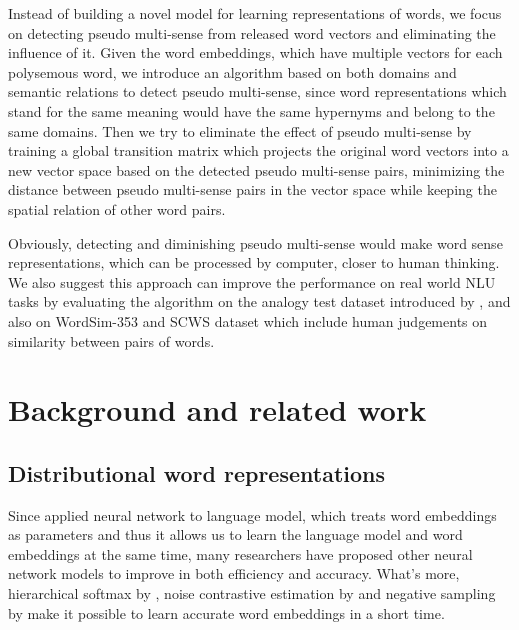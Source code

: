 \documentclass[11pt]{article}
\begin{document}
\par
Instead of building a novel model for learning representations of words, we focus on detecting pseudo multi-sense from released word vectors and eliminating the influence of it. Given the word embeddings, which have multiple vectors for each polysemous word, we introduce an algorithm based on both domains and semantic relations to detect pseudo multi-sense, since word representations which stand for the same meaning would have the same hypernyms and belong to the same domains. Then we try to eliminate the effect of pseudo multi-sense by training a global transition matrix which projects the original word vectors into a new vector space based on the detected pseudo multi-sense pairs, minimizing the distance between pseudo multi-sense pairs in the vector space while keeping the spatial relation of other word pairs. 
\par
Obviously, detecting and diminishing pseudo multi-sense would make word sense representations, which can be processed by computer, closer to human thinking. We also suggest this approach can improve the performance on real world NLU tasks by evaluating the algorithm on the analogy test dataset introduced by , and also on WordSim-353 \cite{finkelstein2001placing} and SCWS \cite{huang2012improving} dataset which include human judgements on similarity between pairs of words.


\section{Background and related work}
\subsection{Distributional word representations}
Since  applied neural network to language model, which treats word embeddings as parameters and thus it allows us to learn the language model and word embeddings at the same time, many researchers have proposed other neural network models \cite{mnih2007three, collobert2008unified, mikolov2013efficient} to improve in both efficiency and accuracy. What's more, hierarchical softmax by , noise contrastive estimation by  and negative sampling by  make it possible to learn accurate word embeddings in a short time.
\end{document}
